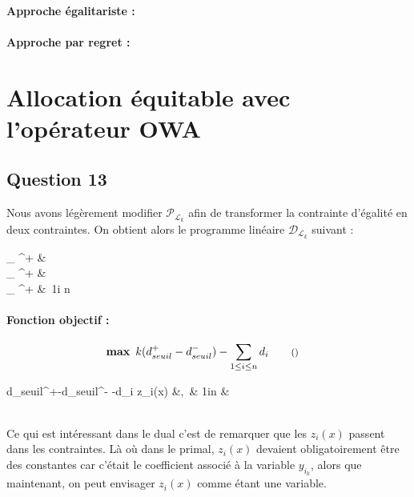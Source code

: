 \documentclass[a4paper, titlepage, oneside, 12pt]{article}%
\newcommand\boldmax{\mathop{\mathbf{max}}}
\newenvironment{fonctionobj}
{ \paragraph{Fonction objectif :}


  }
{  }
\newcommand{\variable}[4]{\underbrace{#1}_{\mathclap{\text{#4}}} \in #2 &\ #3 \\}
\newcommand{\fobj}[2]{\begin{alignat*}{2} #1 &\qquad \text{\footnotesize (#2)} \end{alignat*}}
\newcommand{\constraint}[3]{#1 &,\ & #2 & 
\if\relax\detokenize{#3}\relax
\\
\else
\qquad \text{\footnotesize \textcolor{blue}{\textit{#3}}} \\ 
\fi}
\begin{document}
\paragraph{Approche égalitariste :}

\paragraph{Approche par regret : }

\section{Allocation équitable avec l'opérateur OWA}
\subsection{Question 13}

Nous avons légèrement modifier $\mathcal{P}_{\mathcal{L}_k}$ afin de transformer la contrainte d'égalité en deux contraintes. On obtient alors le programme linéaire $\mathcal{D}_{\mathcal{L}_k}$ suivant :
\begin{mdframed}[style=MyFrame]


\begin{variables}
\variable{d_{seuil}^+}{^+}{}{}
\variable{d_{seuil}^-}{^+}{}{}
\variable{d_{i}}{\mathbb{R}^+}{1\leq i \leq n}{}
\end{variables}

\begin{fonctionobj}
\fobj{\boldmax \ k(d_{seuil}^+ -d_{seuil}^-) -\sum_{\substack{1\leq i \leq n}} d_i} {}
\end{fonctionobj}

\begin{contraintes}
    \constraint{d_{seuil}^+-d_{seuil}^- -d_i \leq z_i(x)}{ 1\leq i\leq n}{}
\end{contraintes}
\end{mdframed}

Ce qui est intéressant dans le dual c'est de remarquer que les $z_i(x)$ passent dans les contraintes. Là où dans le primal, $z_i(x)$ devaient obligatoirement être des constantes car c'était le coefficient associé à la variable $y_{i_k}$, alors que maintenant, on peut envisager $z_i(x)$ comme étant une variable.
\end{document}
